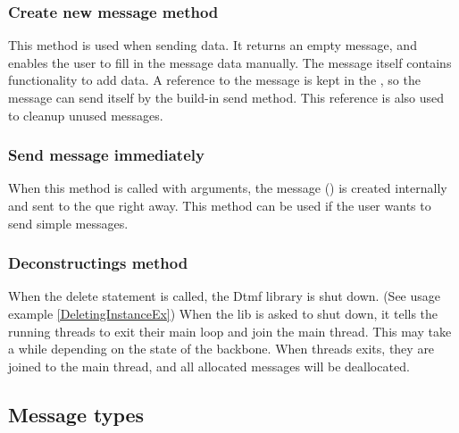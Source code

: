 \subsubsection{Create new message method}
This method is used when sending data. It returns an empty  message, and enables the user to fill in the message data manually. The message itself contains functionality to add data. A reference to the message is kept in the , so the message can send itself by the build-in send method. This reference is also used to cleanup unused messages.

\subsubsection{Send message immediately}
When this method is called with arguments, the message () is created internally and sent to the que right away. This method can be used if the user wants to send simple messages.

\subsubsection{Deconstructings method}
When the delete statement is called, the Dtmf library is shut down. (See usage example \ref{DeletingInstanceEx}) When the lib is asked to shut down, it tells the running threads to exit their main loop and join the main thread. This may take a while depending on the state of the backbone. When threads exits, they are joined to the main thread, and all allocated messages will be deallocated.


\subsection{Message types}\label{sec:api_message_types}
